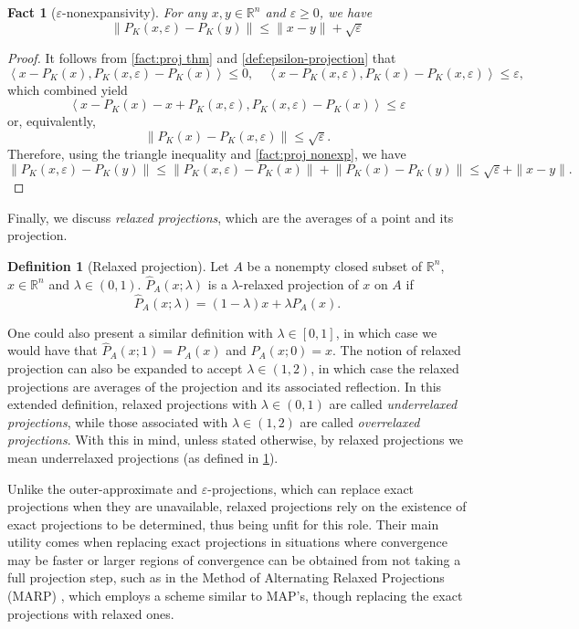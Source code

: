 \documentclass[smallextended,numbook,nospthms]{svjour3}
\theoremstyle{plain}
\newtheorem{fact}[theorem]{Fact}
\theoremstyle{definition}
\newtheorem{definition}[theorem]{Definition}
\def\RR{\mathds R}
\begin{document}
\begin{fact}[$\varepsilon$-nonexpansivity]
	For any $x, y \in \RR^{n}$ and $\varepsilon \geq 0$, we have
	$$
	\left\|P_{K}(x, \varepsilon)-P_{K}(y)\right\| \leq\|x-y\|+\sqrt{\varepsilon}
	$$
\end{fact}
\begin{proof}
	It follows from \cref{fact:proj thm} and \cref{def:epsilon-projection} that
	$$
	\left\langle x-P_{K}(x), P_{K}(x, \varepsilon)-P_{K}(x)\right\rangle \leq 0, \quad\left\langle x-P_{K}(x, \varepsilon), P_{K}(x)-P_{K}(x, \varepsilon)\right\rangle \leq \varepsilon,
	$$
	which combined yield
	$$
	\left\langle x-P_{K}(x)-x+P_{K}(x, \varepsilon), P_{K}(x, \varepsilon)-P_{K}(x)\right\rangle \leq \varepsilon
	$$
	or, equivalently,
	$$
	\left\|P_{K}(x)-P_{K}(x, \varepsilon)\right\| \leq \sqrt{\varepsilon}.
	$$
	Therefore, using the triangle inequality and \cref{fact:proj nonexp}, we have
	\[
	\left\|P_{K}(x, \varepsilon)-P_{K}(y)\right\| \leq\left\|P_{K}(x, \varepsilon)-P_{K}(x)\right\|+\left\|P_{K}(x)-P_{K}(y)\right\| \leq \sqrt{\varepsilon}+\|x-y\|.
	\]
\end{proof}

Finally, we discuss \emph{relaxed projections}, which are the averages of a point and its projection.

\begin{definition}[Relaxed projection]\label{def:relax proj}
	Let $A$ be a nonempty closed subset of $\RR^n$, $x \in \RR^n$ and $\lambda \in (0,1)$. $\hat{P}_{A}(x; \lambda)$ is a $\lambda$-relaxed projection of $x$ on $A$ if 
	$$
	\hat{P}_{A}(x; \lambda)=(1-\lambda)x+\lambda P_{A}(x).
	$$
\end{definition}
One could also present a similar definition with $\lambda \in [0,1]$, in which case we would have that $\hat{P}_{A}(x;1)=P_{A}(x)$ and $\hat{P}_{A}(x;0)=x$.
The notion of relaxed projection can also be expanded to accept $\lambda \in (1,2)$, in which case the relaxed projections are averages of the projection and its associated reflection. In this extended definition, relaxed projections with $\lambda \in (0,1)$ are called \emph{underrelaxed projections}, while those associated with $\lambda \in (1,2)$ are called \emph{overrelaxed projections}. With this in mind, unless stated otherwise, by relaxed projections we mean underrelaxed projections (as defined in \cref{def:relax proj}).

Unlike the outer-approximate and $\varepsilon$-projections, which can replace exact projections when they are unavailable, relaxed projections rely on the existence of exact projections to be determined, thus being unfit for this role. Their main utility comes when replacing exact projections in situations where convergence may be faster or larger regions of convergence can be obtained from not taking a full projection step, such as in the Method of Alternating Relaxed Projections (MARP) \cite{Bauschke:2013}, which employs a scheme similar to MAP's, though replacing the exact projections with relaxed ones.
\end{document}
